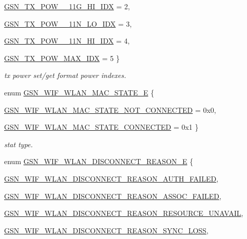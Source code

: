 \begin{DoxyCompactItemize}
\par
\hyperlink{a00640_gga75fc31972dc5127c4ee4b3e585ab0206aa05a5fdd8b3cbb522655e6c2e400bd23}{GSN\_\-TX\_\-POW\_\_\-11G\_\-HI\_\-IDX} =  2, 
\par
\hyperlink{a00640_gga75fc31972dc5127c4ee4b3e585ab0206a2b481aadf4f8c66408beb3dfa4d84fc7}{GSN\_\-TX\_\-POW\_\_\-11N\_\-LO\_\-IDX} =  3, 
\par
\hyperlink{a00640_gga75fc31972dc5127c4ee4b3e585ab0206a0d66ebcda580eb26e8347354d3087d70}{GSN\_\-TX\_\-POW\_\_\-11N\_\-HI\_\-IDX} =  4, 
\par
\hyperlink{a00640_gga75fc31972dc5127c4ee4b3e585ab0206a647770c3d643ef01c522760760b94172}{GSN\_\-TX\_\-POW\_\-MAX\_\-IDX} =  5
 \}
\begin{DoxyCompactList}\small\item\em tx power set/get format power indexes. \end{DoxyCompactList}\item 
enum \hyperlink{a00677_gaf26e714e09b57b3b2a5f21341613761d}{GSN\_\-WIF\_\-WLAN\_\-MAC\_\-STATE\_\-E} \{ \par
\hyperlink{a00640_ggaf26e714e09b57b3b2a5f21341613761da29bec55c1820017c55b7eebc1cbb2698}{GSN\_\-WIF\_\-WLAN\_\-MAC\_\-STATE\_\-NOT\_\-CONNECTED} =  0x0, 
\par
\hyperlink{a00640_ggaf26e714e09b57b3b2a5f21341613761daf9bfe447cd6ae519e8f1f06ce72a39a9}{GSN\_\-WIF\_\-WLAN\_\-MAC\_\-STATE\_\-CONNECTED} =  0x1
 \}
\begin{DoxyCompactList}\small\item\em stat type. \end{DoxyCompactList}\item 
enum \hyperlink{a00677_ga9dd854d0108dc49ff077a04e897e3518}{GSN\_\-WIF\_\-WLAN\_\-DISCONNECT\_\-REASON\_\-E} \{ \par
\hyperlink{a00640_gga9dd854d0108dc49ff077a04e897e3518af4c7545e3a50f0a4b80e819642f6fa11}{GSN\_\-WIF\_\-WLAN\_\-DISCONNECT\_\-REASON\_\-AUTH\_\-FAILED}, 
\par
\hyperlink{a00640_gga9dd854d0108dc49ff077a04e897e3518ab326383254792bc87a5b3dd116a846fa}{GSN\_\-WIF\_\-WLAN\_\-DISCONNECT\_\-REASON\_\-ASSOC\_\-FAILED}, 
\par
\hyperlink{a00640_gga9dd854d0108dc49ff077a04e897e3518aee4dc21ac6db977675d9681fa1f87131}{GSN\_\-WIF\_\-WLAN\_\-DISCONNECT\_\-REASON\_\-RESOURCE\_\-UNAVAIL}, 
\par
\hyperlink{a00640_gga9dd854d0108dc49ff077a04e897e3518a571260d569e804028dc21870862dbf8d}{GSN\_\-WIF\_\-WLAN\_\-DISCONNECT\_\-REASON\_\-SYNC\_\-LOSS}, 

\end{DoxyCompactItemize}
